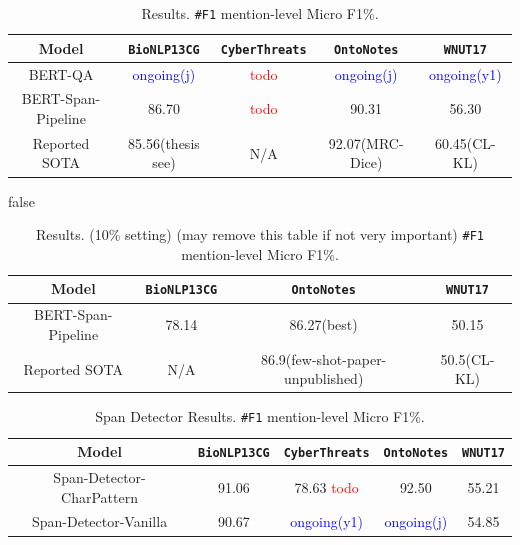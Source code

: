 \begin{table}[h!]
\centering
\begin{small}
\begin{tabular}{ccccc}\toprule
 \textbf{Model} & \texttt{BioNLP13CG} & \texttt{CyberThreats} & \texttt{OntoNotes} & \texttt{WNUT17} \\ \toprule 
BERT-QA & \textcolor{blue}{ongoing(j)} & \textcolor{red}{todo} & \textcolor{blue}{ongoing(j)}  & \textcolor{blue}{ongoing(y1)} \\
BERT-Span-Pipeline     & 86.70 & \textcolor{red}{todo} & 90.31 & 56.30  \\
Reported SOTA & 85.56(thesis see) & N/A & 92.07(MRC-Dice) & 60.45(CL-KL)  \\
\bottomrule
\end{tabular}
\caption{Results. \texttt{\#F1} mention-level Micro F1\%. }
\label{tab:main}
\end{small}
\end{table}

\if false
\begin{table}[h!]
\centering
\begin{small}
\begin{tabular}{cccc}\toprule
 \textbf{Model} & \texttt{BioNLP13CG} & \texttt{OntoNotes} & \texttt{WNUT17} \\ \toprule 
BERT-Span-Pipeline     & 78.14 & 86.27(best) & 50.15  \\
Reported SOTA & N/A & 86.9(few-shot-paper-unpublished) & 50.5(CL-KL)  \\
\bottomrule
\end{tabular}
\caption{Results. (10\% setting) (may remove this table if not very important) \texttt{\#F1} mention-level Micro F1\%.}
\label{tab:main}
\end{small}
\end{table}
\fi

\begin{table}[h!]
\centering
\begin{small}
\begin{tabular}{ccccc}\toprule
 \textbf{Model} & \texttt{BioNLP13CG} & \texttt{CyberThreats} & \texttt{OntoNotes} & \texttt{WNUT17} \\ \toprule 
Span-Detector-CharPattern & 91.06 & 78.63 \textcolor{red}{todo}& 92.50 & 55.21  \\
Span-Detector-Vanilla     & 90.67 & \textcolor{blue}{ongoing(y1)} & \textcolor{blue}{ongoing(j)} & 54.85  \\
\bottomrule
\end{tabular}
\caption{Span Detector Results. \texttt{\#F1} mention-level Micro F1\%.}
\label{tab:det_ablation}
\end{small}
\end{table}

